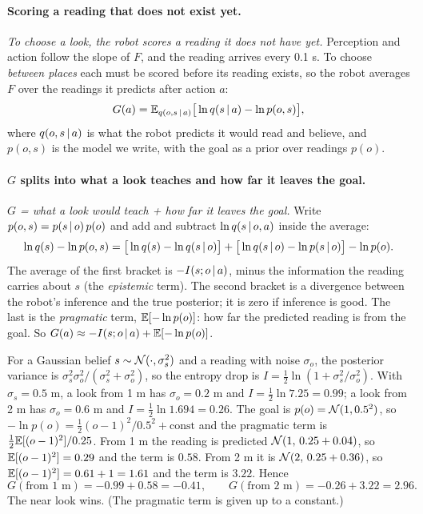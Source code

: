\documentclass[11pt]{article}
\newcommand{\slt}[1]{\emph{#1}}   %
\begin{document}
\paragraph{Scoring a reading that does not exist yet.} \slt{To choose a look, the robot scores a reading it does not have yet.} Perception and action follow the slope of $F$, and the reading arrives every 0.1 s. To choose \emph{between places} each must be scored before its reading exists, so the robot averages $F$ over the readings it predicts after action $a$:
\[
G(a)=\mathbb{E}_{q(o,s\,|\, a)}\big[\ln q(s\,|\, a)-\ln p(o,s)\big],
\]
where $q(o,s\,|\, a)$ is what the robot predicts it would read and believe, and $p(o,s)$ is the model we write, with the goal as a prior over readings $p(o)$.

\paragraph{$G$ splits into what a look teaches and how far it leaves the goal.} \slt{$G$ = what a look would teach + how far it leaves the goal.} Write $p(o,s)=p(s\,|\, o)\,p(o)$ and add and subtract $\ln q(s\,|\, o,a)$ inside the average:
\[
\ln q(s)-\ln p(o,s)=\big[\ln q(s)-\ln q(s\,|\, o)\big]+\big[\ln q(s\,|\, o)-\ln p(s\,|\, o)\big]-\ln p(o).
\]
The average of the first bracket is $-I(s;o\,|\, a)$, minus the information the reading carries about $s$ (the \emph{epistemic} term). The second bracket is a divergence between the robot's inference and the true posterior; it is zero if inference is good. The last is the \emph{pragmatic} term, $\mathbb{E}[-\ln p(o)]$: how far the predicted reading is from the goal. So $G(a)\approx-I(s;o\,|\, a)+\mathbb{E}[-\ln p(o)]$.

For a Gaussian belief $s\sim\mathcal{N}(\cdot,\sigma_s^2)$ and a reading with noise $\sigma_o$, the posterior variance is $\sigma_s^2\sigma_o^2/(\sigma_s^2+\sigma_o^2)$, so the entropy drop is $I=\tfrac12\ln(1+\sigma_s^2/\sigma_o^2)$. With $\sigma_s=0.5$ m, a look from 1 m has $\sigma_o=0.2$ m and $I=\tfrac12\ln7.25=0.99$; a look from 2 m has $\sigma_o=0.6$ m and $I=\tfrac12\ln1.694=0.26$. The goal is $p(o)=\mathcal{N}(1,0.5^2)$, so $-\ln p(o)=\tfrac12(o-1)^2/0.5^2+\text{const}$ and the pragmatic term is $\tfrac12\mathbb{E}[(o-1)^2]/0.25$. From 1 m the reading is predicted $\mathcal{N}(1,\,0.25+0.04)$, so $\mathbb{E}[(o-1)^2]=0.29$ and the term is $0.58$. From 2 m it is $\mathcal{N}(2,\,0.25+0.36)$, so $\mathbb{E}[(o-1)^2]=0.61+1=1.61$ and the term is $3.22$. Hence
\[
G(\text{from }1\text{ m})=-0.99+0.58=-0.41,\qquad G(\text{from }2\text{ m})=-0.26+3.22=2.96 .
\]
The near look wins. (The pragmatic term is given up to a constant.)
\end{document}
